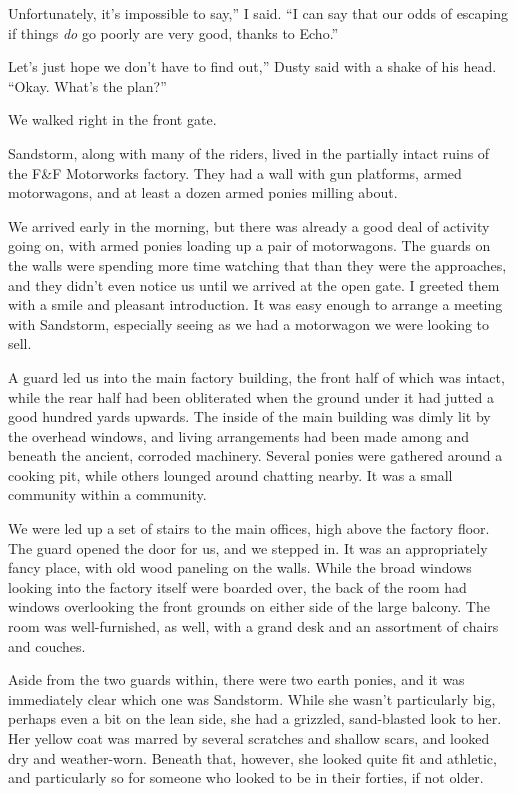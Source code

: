 \leavevmode{}Unfortunately, it’s impossible to say,” I said. “I can say that our odds of escaping if things \textit{do} go poorly are very good, thanks to Echo.”

\leavevmode{}Let’s just hope we don’t have to find out,” Dusty said with a shake of his head. “Okay. What’s the plan?”

{\br}%
We walked right in the front gate.

Sandstorm, along with many of the riders, lived in the partially intact ruins of the F\&F Motorworks factory. They had a wall with gun platforms, armed motorwagons, and at least a dozen armed ponies milling about.

We arrived early in the morning, but there was already a good deal of activity going on, with armed ponies loading up a pair of motorwagons. The guards on the walls were spending more time watching that than they were the approaches, and they didn’t even notice us until we arrived at the open gate. I greeted them with a smile and pleasant introduction. It was easy enough to arrange a meeting with Sandstorm, especially seeing as we had a motorwagon we were looking to sell.

A guard led us into the main factory building, the front half of which was intact, while the rear half had been obliterated when the ground under it had jutted a good hundred yards upwards. The inside of the main building was dimly lit by the overhead windows, and living arrangements had been made among and beneath the ancient, corroded machinery. Several ponies were gathered around a cooking pit, while others lounged around chatting nearby. It was a small community within a community.

We were led up a set of stairs to the main offices, high above the factory floor. The guard opened the door for us, and we stepped in. It was an appropriately fancy place, with old wood paneling on the walls. While the broad windows looking into the factory itself were boarded over, the back of the room had windows overlooking the front grounds on either side of the large balcony. The room was well-furnished, as well, with a grand desk and an assortment of chairs and couches.

Aside from the two guards within, there were two earth ponies, and it was immediately clear which one was Sandstorm. While she wasn’t particularly big, perhaps even a bit on the lean side, she had a grizzled, sand-blasted look to her. Her yellow coat was marred by several scratches and shallow scars, and looked dry and weather-worn. Beneath that, however, she looked quite fit and athletic, and particularly so for someone who looked to be in their forties, if not older.

